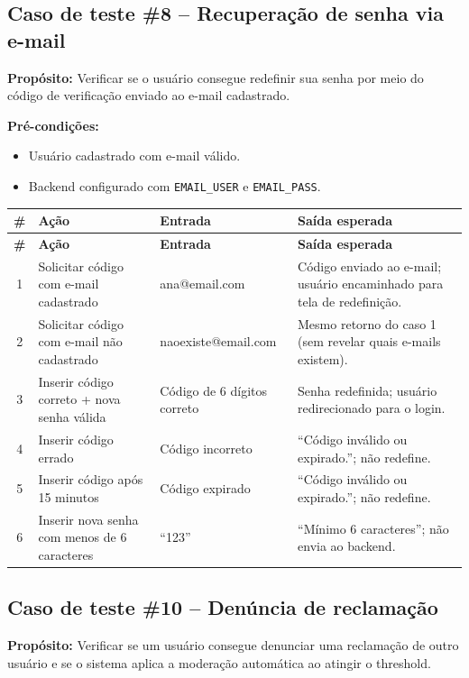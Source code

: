 \subsection*{Caso de teste \#8 – Recuperação de senha via e-mail}

\textbf{Propósito:} Verificar se o usuário consegue redefinir sua senha por
meio do código de verificação enviado ao e-mail cadastrado.

\textbf{Pré-condições:}
\begin{itemize}
  \item Usuário cadastrado com e-mail válido.
  \item Backend configurado com \texttt{EMAIL\_USER} e \texttt{EMAIL\_PASS}.
\end{itemize}

\begin{longtable}{|c|p{3.5cm}|p{3cm}|p{5cm}|}
  \hline
  \textbf{\#} & \textbf{Ação} & \textbf{Entrada} & \textbf{Saída esperada} \\
  \hline
  \endfirsthead
  \hline
  \textbf{\#} & \textbf{Ação} & \textbf{Entrada} & \textbf{Saída esperada} \\
  \hline
  \endhead
  1 & Solicitar código com e-mail cadastrado & ana@email.com & Código enviado ao e-mail; usuário encaminhado para tela de redefinição. \\
  \hline
  2 & Solicitar código com e-mail não cadastrado & naoexiste@email.com & Mesmo retorno do caso 1 (sem revelar quais e-mails existem). \\
  \hline
  3 & Inserir código correto + nova senha válida & Código de 6 dígitos correto & Senha redefinida; usuário redirecionado para o login. \\
  \hline
  4 & Inserir código errado & Código incorreto & ``Código inválido ou expirado.''; não redefine. \\
  \hline
  5 & Inserir código após 15 minutos & Código expirado & ``Código inválido ou expirado.''; não redefine. \\
  \hline
  6 & Inserir nova senha com menos de 6 caracteres & ``123'' & ``Mínimo 6 caracteres''; não envia ao backend. \\
  \hline
\end{longtable}

\subsection*{Caso de teste \#10 – Denúncia de reclamação}

\textbf{Propósito:} Verificar se um usuário consegue denunciar uma reclamação de outro usuário e se o sistema aplica a moderação automática ao atingir o threshold.

